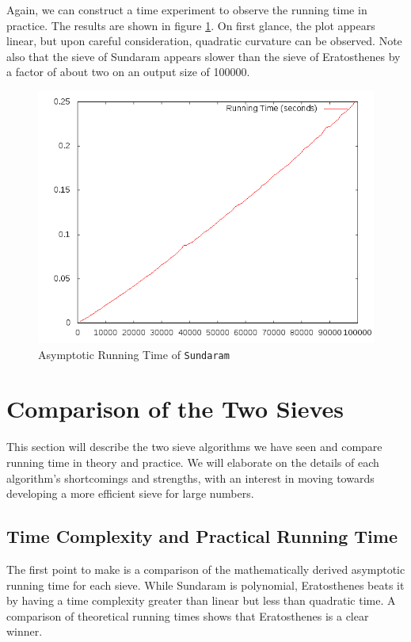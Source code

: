 \documentclass{amsart}
\theoremstyle{definition}
\theoremstyle{case}
\begin{document}
	Again, we can construct a time experiment to observe the running time in practice. The results are shown in figure \ref{runtime2}. On first glance, the plot appears linear, but upon careful consideration, quadratic curvature can be observed. Note also that the sieve of Sundaram appears slower than the sieve of Eratosthenes by a factor of about two on an output size of 100000.
	
	\begin{figure}\caption{Asymptotic Running Time of \texttt{Sundaram}}
		\label{runtime2}
		\includegraphics[scale=0.5]{sund2.png}
	\end{figure}
	
	\section{Comparison of the Two Sieves}
	
	This section will describe the two sieve algorithms we have seen and compare running time in theory and practice. We will elaborate on the details of each algorithm's shortcomings and strengths, with an interest in moving towards developing a more efficient sieve for large numbers.
	
	\subsection{Time Complexity and Practical Running Time}
	The first point to make is a comparison of the mathematically derived asymptotic running time for each sieve. While Sundaram is polynomial, Eratosthenes beats it by having a time complexity greater than linear but less than quadratic time. A comparison of theoretical running times shows that Eratosthenes is a clear winner.
	
\end{document}
